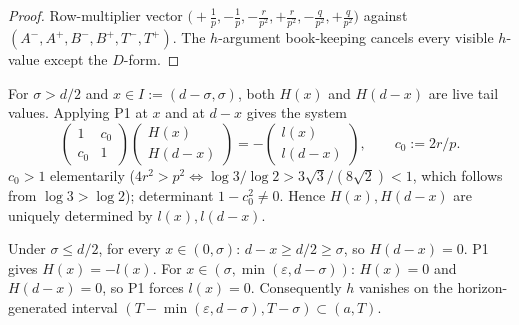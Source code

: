 \begin{proof}
Row-multiplier vector
$\bigl(+\tfrac{1}{p}, -\tfrac{1}{p}, -\tfrac{r}{p^{2}},
+\tfrac{r}{p^{2}}, -\tfrac{q}{p^{2}}, +\tfrac{q}{p^{2}}\bigr)$
against $(A^{-}, A^{+}, B^{-}, B^{+}, T^{-}, T^{+})$.  The
$h$-argument book-keeping cancels every visible $h$-value except
the $D$-form.
\end{proof}

\begin{corollary}
\label{cor:p12-P1-caseB}
For $\sigma > d/2$ and $x \in I := (d - \sigma, \sigma)$, both
$H(x)$ and $H(d - x)$ are live tail values.  Applying P1 at $x$ and
at $d - x$ gives the system
\[
\begin{pmatrix} 1 & c_{0} \\ c_{0} & 1 \end{pmatrix}
\begin{pmatrix} H(x) \\ H(d - x) \end{pmatrix}
= -\begin{pmatrix} l(x) \\ l(d - x) \end{pmatrix},
\qquad c_{0} := 2r / p.
\]
$c_{0} > 1$ elementarily ($4 r^{2} > p^{2} \iff \log 3 / \log 2 >
3\sqrt{3}/(8\sqrt{2}) < 1$, which follows from $\log 3 > \log 2$);
determinant $1 - c_{0}^{2} \ne 0$.  Hence $H(x), H(d - x)$ are
uniquely determined by $l(x), l(d - x)$.
\end{corollary}

\begin{corollary}
\label{cor:p12-P1-subhalf}
Under $\sigma \le d/2$, for every $x \in (0, \sigma)$:
$d - x \ge d/2 \ge \sigma$, so $H(d - x) = 0$.  P1 gives
$H(x) = -l(x)$.  For
$x \in (\sigma, \min(\varepsilon, d - \sigma))$: $H(x) = 0$ and
$H(d - x) = 0$, so P1 forces $l(x) = 0$.  Consequently $h$ vanishes
on the horizon-generated interval
$(T - \min(\varepsilon, d - \sigma), T - \sigma) \subset (a, T)$.
\end{corollary}
